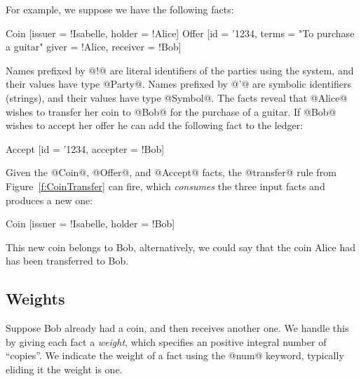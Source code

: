 For example, we suppose we have the following facts:
\begin{small}
\begin{code}
 Coin   [issuer = !Isabelle, holder = !Alice]
 Offer  [id     = '1234,  terms    = "To purchase a guitar"
         giver  = !Alice, receiver = !Bob]
\end{code}
\end{small}

Names prefixed by @!@ are literal identifiers of the parties using the system, and their values have type @Party@. Names prefixed by @'@ are symbolic identifiers (strings), and their values have type @Symbol@. The facts reveal that @Alice@ wishes to transfer her coin to @Bob@ for the purchase of a guitar. If @Bob@ wishes to accept her offer he can add the following fact to the ledger:
\begin{small}
\begin{code}
 Accept [id = '1234, accepter = !Bob]
\end{code}
\end{small}

Given the @Coin@, @Offer@, and @Accept@ facts, the @transfer@ rule from Figure~\ref{f:CoinTransfer} can fire, which \emph{consumes} the three input facts and produces a new one:
\begin{small}
\begin{code}
 Coin   [issuer = !Isabelle, holder = !Bob]
\end{code}
\end{small}

This new coin belongs to Bob, alternatively, we could say that the coin Alice had has been transferred to Bob.



\subsection{Weights}
\label{s:Weights}
Suppose Bob already had a coin, and then receives another one. We handle this by giving each fact a \emph{weight}, which specifies an positive integral number of ``copies''. We indicate the weight of a fact using the @num@ keyword, typically eliding it the weight is one.

